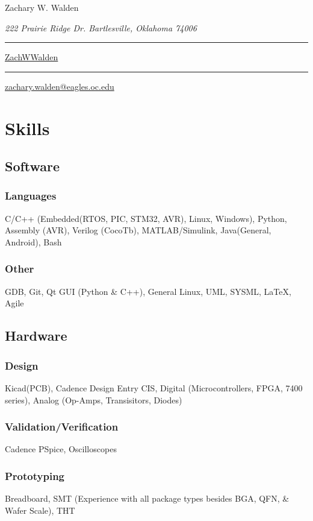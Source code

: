 \documentclass{article}
\newcommand\mybar{\kern1pt\rule[-\dp\strutbox]{.8pt}{\baselineskip}\kern1pt}
\begin{document}
\begin{center}
	\begin{Huge}
		Zachary W. Walden\\
	\end{Huge}
	\begin{large}
		\textsl{222 Prairie Ridge Dr. Bartlesville, Oklahoma 74006}\\
	\end{large}
	\begin{small}
		 \mybar { } \faGithub \href{https://github.com/ZachWWalden}{ ZachWWalden}
		\mybar { }\faEnvelope\href{mailto::zachary.walden@eagles.oc.edu}{ zachary.walden@eagles.oc.edu}
	\end{small}
\end{center}
\section{Skills}
	\subsection{Software}
		\subsubsection{Languages} C/C++ (Embedded(RTOS, PIC, STM32, AVR), Linux, Windows), Python, Assembly (AVR), Verilog (CocoTb), MATLAB/Simulink, Java(General, Android), Bash
		\subsubsection{Other} GDB, Git, Qt GUI (Python \& C++), General Linux, UML, SYSML, \LaTeX, Agile
	\subsection{Hardware}
		\subsubsection{Design} Kicad(PCB), Cadence Design Entry CIS, Digital (Microcontrollers, FPGA, 7400 series), Analog (Op-Amps, Transisitors, Diodes)
		\subsubsection{Validation/Verification} Cadence PSpice, Oscilloscopes
		\subsubsection{Prototyping} Breadboard, SMT (Experience with all package types besides BGA, QFN, \& Wafer Scale), THT
\end{document}
